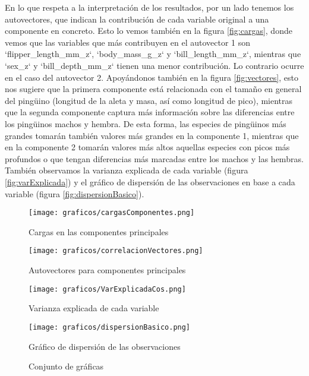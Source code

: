 \documentclass[a4paper,onecolumn]{extarticle}
\begin{document}
\begin{sloppypar}
En lo que respeta a la interpretación de los resultados, por un lado tenemos los autovectores, que indican la contribución de cada variable original a una 
componente en concreto. Esto lo vemos también en la figura \ref{fig:cargas}, donde vemos que las variables que más contribuyen en el autovector 1 son 
`flipper\_length\_mm\_z`, `body\_mass\_g\_z` y `bill\_length\_mm\_z`, mientras que `sex\_z` y `bill\_depth\_mm\_z` tienen una menor contribución. Lo contrario 
ocurre en el caso del autovector 2. Apoyándonos también en la figura \ref{fig:vectores}, esto nos sugiere que la primera componente está relacionada con el 
tamaño en general del pingüino (longitud de la aleta y masa, así como longitud de pico), mientras que la segunda componente captura más información sobre las 
diferencias entre los pingüinos machos y hembra. De esta forma, las especies de pingüinos más grandes tomarán también valores más grandes en la componente 1, 
mientras que en la componente 2 tomarán valores más altos aquellas especies con picos más profundos o que tengan diferencias más marcadas entre los machos y 
las hembras. También observamos la varianza explicada de cada variable (figura \ref{fig:varExplicada}) y el gráfico de dispersión de las observaciones en 
base a cada variable (figura \ref{fig:dispersionBasico}).

\begin{center}
    \begin{figure}[h!]
        \centering
        \begin{minipage}{0.45\textwidth}
            \centering
            \texttt{[image: graficos/cargasComponentes.png]}
            \caption{\small{Cargas en las componentes principales}}
            \label{fig:cargas}
        \end{minipage}
        \hspace{0.005\textwidth} %
        \begin{minipage}{0.45\textwidth}
            \centering
            \texttt{[image: graficos/correlacionVectores.png]}
            \caption{\small{Autovectores para componentes principales}}
            \label{fig:vectores}
        \end{minipage}
        \centering
        \begin{minipage}{0.45\textwidth}
            \centering
            \texttt{[image: graficos/VarExplicadaCos.png]}
            \caption{\small{Varianza explicada de cada variable}}
            \label{fig:varExplicada}
        \end{minipage}
        \hspace{0.005\textwidth} %
        \begin{minipage}{0.45\textwidth}
            \centering
            \texttt{[image: graficos/dispersionBasico.png]}
            \caption{\small{Gráfico de dispersión de las observaciones}}
            \label{fig:dispersionBasico}
        \end{minipage}
        \caption{Conjunto de gráficas}
        \label{fig:multiplesGraficas}
    \end{figure}
\end{center}


\end{sloppypar}
\end{document}
